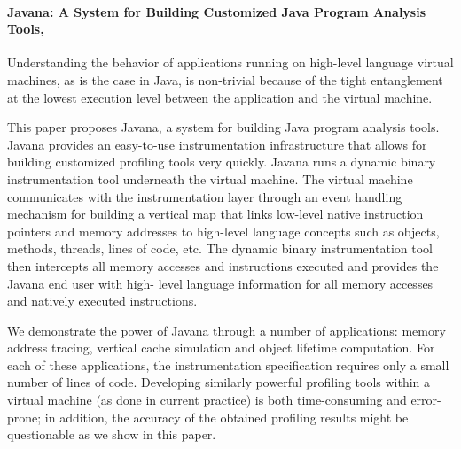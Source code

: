 \paragraph{Javana: A System for Building Customized Java Program Analysis Tools, \cite{Maebe06javana:a}}
Understanding the behavior of applications running on high-level
language virtual machines, as is the case in Java, is non-trivial because of the tight entanglement at the lowest execution level between the application and the virtual machine.

This paper proposes Javana, a system for building Java program analysis tools.
Javana provides an easy-to-use instrumentation infrastructure that allows
for building customized profiling tools very quickly.
Javana runs a dynamic binary instrumentation tool underneath
the virtual machine. The virtual machine communicates with the
instrumentation layer through an event handling mechanism for
building a vertical map that links low-level native instruction pointers and memory addresses to high-level language concepts such as
objects, methods, threads, lines of code, etc.
The dynamic binary instrumentation tool then intercepts all memory accesses and instructions executed and provides the Javana end user with high-
level language information for all memory accesses and natively
executed instructions.

We demonstrate the power of Javana through a number of applications: memory address tracing, vertical cache simulation and
object lifetime computation.
For each of these applications, the instrumentation specification requires only a small number of lines
of code.
Developing similarly powerful profiling tools within a virtual machine (as done in current practice) is both time-consuming
and error-prone; in addition, the accuracy of the obtained profiling
results might be questionable as we show in this paper.

